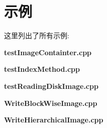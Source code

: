 \section{示例}
这里列出了所有示例\-:\begin{DoxyCompactItemize}
\item 
{\bf test\-Image\-Containter.\-cpp}
\item 
{\bf test\-Index\-Method.\-cpp}
\item 
{\bf test\-Reading\-Disk\-Image.\-cpp}
\item 
{\bf Write\-Block\-Wise\-Image.\-cpp}
\item 
{\bf Write\-Hierarchical\-Image.\-cpp}
\end{DoxyCompactItemize}
